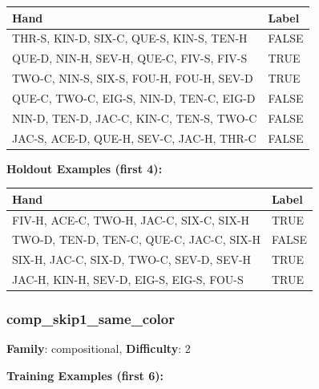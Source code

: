 \documentclass[10pt,a4paper]{article}
\begin{document}
\begin{small}
\begin{tabular}{p{8cm}l}
\toprule
Hand & Label \\
\midrule
THR-S, KIN-D, SIX-C, QUE-S, KIN-S, TEN-H & \textcolor{negative}{FALSE} \\
QUE-D, NIN-H, SEV-H, QUE-C, FIV-S, FIV-S & \textcolor{positive}{TRUE} \\
TWO-C, NIN-S, SIX-S, FOU-H, FOU-H, SEV-D & \textcolor{positive}{TRUE} \\
QUE-C, TWO-C, EIG-S, NIN-D, TEN-C, EIG-D & \textcolor{negative}{FALSE} \\
NIN-D, TEN-D, JAC-C, KIN-C, TEN-S, TWO-C & \textcolor{negative}{FALSE} \\
JAC-S, ACE-D, QUE-H, SEV-C, JAC-H, THR-C & \textcolor{negative}{FALSE} \\
\bottomrule
\end{tabular}
\end{small}

\textbf{Holdout Examples (first 4):}

\begin{small}
\begin{tabular}{p{8cm}l}
\toprule
Hand & Label \\
\midrule
FIV-H, ACE-C, TWO-H, JAC-C, SIX-C, SIX-H & \textcolor{positive}{TRUE} \\
TWO-D, TEN-D, TEN-C, QUE-C, JAC-C, SIX-H & \textcolor{negative}{FALSE} \\
SIX-H, JAC-C, SIX-D, TWO-C, SEV-D, SEV-H & \textcolor{positive}{TRUE} \\
JAC-H, KIN-H, SEV-D, EIG-S, EIG-S, FOU-S & \textcolor{positive}{TRUE} \\
\bottomrule
\end{tabular}
\end{small}

\vspace{0.5cm}

\subsubsection{comp\_skip1\_same\_color}

\textbf{Family}: compositional, \textbf{Difficulty}: 2

\textbf{Training Examples (first 6):}
\end{document}
